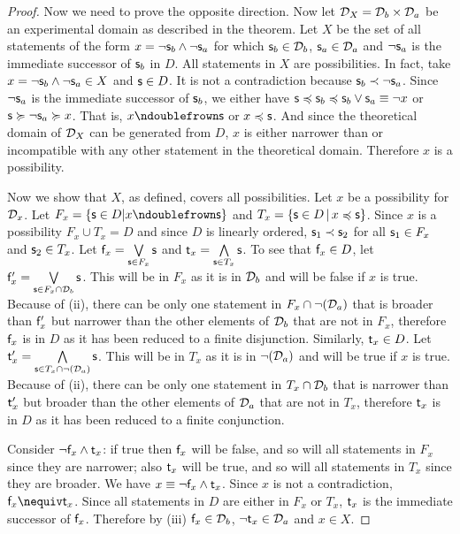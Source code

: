 \documentclass[11pt,letterpaper,fleqn]{memoir} %
\begin{document}
\begin{mathSection}
\begin{proof}
	Now we need to prove the opposite direction. Now let $\edomain_X = \edomain_b \times \edomain_a$ be an experimental domain as described in the theorem. Let $X$ be the set of all statements of the form $x = \NOT \stmt_b \AND \NOT \stmt_a$ for which $\stmt_b \in \edomain_b$, $\stmt_a \in \edomain_a$ and $\NOT \stmt_a$ is the immediate successor of $\stmt_b$ in $D$. All statements in $X$ are possibilities. In fact, take $x = \NOT \stmt_b \AND \NOT \stmt_a \in X$ and $\stmt \in D$. It is not a contradiction because $\stmt_b \snarrower \NOT \stmt_a$. Since $\NOT \stmt_a$ is the immediate successor of $\stmt_b$, we either have $\stmt \narrower \stmt_b \narrower \stmt_b \OR \stmt_a \equiv \NOT x$ or $\stmt \broader \NOT \stmt_a \broader x$. That is, $x \ncomp \stmt$ or $x \narrower \stmt$. And since the theoretical domain of $\edomain_X$ can be generated from $D$, $x$ is either narrower than or incompatible with any other statement in the theoretical domain. Therefore $x$ is a possibility.
	
	Now we show that $X$, as defined, covers all possibilities. Let $x$ be a possibility for $\edomain_x$. Let $F_x=\{\stmt \in D| x \ncomp \stmt \}$ and $T_x=\{\stmt \in D \, | \, x \narrower \stmt \}$. Since $x$ is a possibility $F_x \cup T_x = D$ and since $D$ is linearly ordered, $\stmt_1 \snarrower \stmt_2$ for all $\stmt_1 \in F_x$ and $\stmt_2 \in T_x$. Let $\stmt[f]_x = \bigOR\limits_{\stmt \in F_x} \stmt$ and $\stmt[t]_x = \bigAND\limits_{\stmt \in T_x} \stmt$. To see that $\stmt[f]_x \in D$, let $\stmt[f]'_x = \bigOR\limits_{\stmt \in F_x\cap\edomain_b} \stmt$. This will be in $F_x$ as it is in $\edomain_b$ and will be false if $x$ is true. Because of (ii), there can be only one statement in $F_x \cap \NOT(\edomain_a)$ that is broader than $\stmt[f]'_x$ but narrower than the other elements of $\edomain_b$ that are not in $F_x$, therefore $\stmt[f]_x$ is in $D$ as it has been reduced to a finite disjunction. Similarly, $\stmt[t]_x \in D$. Let $\stmt[t]'_x = \bigAND\limits_{\stmt \in T_x\cap \NOT(\edomain_a)} \stmt$. This will be in $T_x$ as it is in $\NOT (\edomain_a)$ and will be true if $x$ is true. Because of (ii), there can be only one statement in $T_x \cap \edomain_b$ that is narrower than $\stmt[t]'_x$ but broader than the other elements of $\edomain_a$ that are not in $T_x$, therefore $\stmt[t]_x$ is in $D$ as it has been reduced to a finite conjunction.
	
	Consider $\NOT \stmt[f]_x \AND \stmt[t]_x$: if true then $\stmt[f]_x$ will be false, and so will all statements in $F_x$ since they are narrower; also $\stmt[t]_x$ will be true, and so will all statements in $T_x$ since they are broader. We have $x \equiv \NOT \stmt[f]_x \AND \stmt[t]_x$. Since $x$ is not a contradiction, $\stmt[f]_x \nequiv \stmt[t]_x$. Since all statements in $D$ are either in $F_x$ or $T_x$, $\stmt[t]_x$ is the immediate successor of $\stmt[f]_x$. Therefore by (iii) $\stmt[f]_x \in \edomain_b$,  $\NOT \stmt[t]_x \in \edomain_a$ and $x \in X$.


\end{proof}
\end{mathSection}
\end{document}
